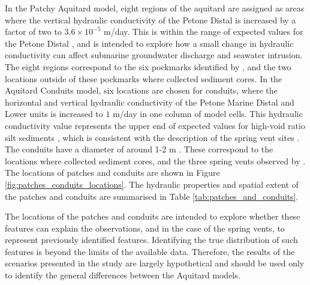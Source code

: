 \documentclass[draft, 10pt]{agujournal2019}
\begin{document}
In the Patchy Aquitard model, eight regions of the aquitard are assigned as areas where the vertical hydraulic conductivity of the Petone Distal is increased by a factor of two to $3.6 \times 10^{-5}$ m/day.
This is within the range of expected values for the Petone Distal \cite{bennett_hutt_2024},
and is intended to explore how a small change in hydraulic conductivity can affect submarine groundwater discharge and seawater intrusion.
The eight regions correspond to the six pockmarks identified by , and the two locations outside of these pockmarks where  collected sediment cores.
In the Aquitard Conduits model, six locations are chosen for conduits,
where the horizontal and vertical hydraulic conductivity of the Petone Marine Distal and Lower units is increased to $1$ m/day in one column of model cells.
This hydraulic conductivity value represents the upper end of expected values for high-void ratio silt sediments \cite{zhu_experimental_2021},
which is consistent with the description of the spring vent sites \cite{hoffmann_fresh_2023, harding_characteristics_2000}.
The conduits have a diameter of around 1-2 m \cite{harding_characteristics_2000}.
These correspond to the locations where  collected sediment cores,
and the three spring vents observed by .
The locations of patches and conduits are shown in Figure \ref{fig:patches_conduits_locations}.
The hydraulic properties and spatial extent of the patches and conduits are summarised in Table \ref{tab:patches_and_conduits}.

The locations of the patches and conduits are intended to explore whether these features can explain the observations,
and in the case of the spring vents, to represent previously identified features.
Identifying the true distribution of such features is beyond the limits of the available data.
Therefore, the results of the scenarios presented in the study are largely hypothetical and should be used only to identify the general differences between the Aquitard models.
\end{document}
